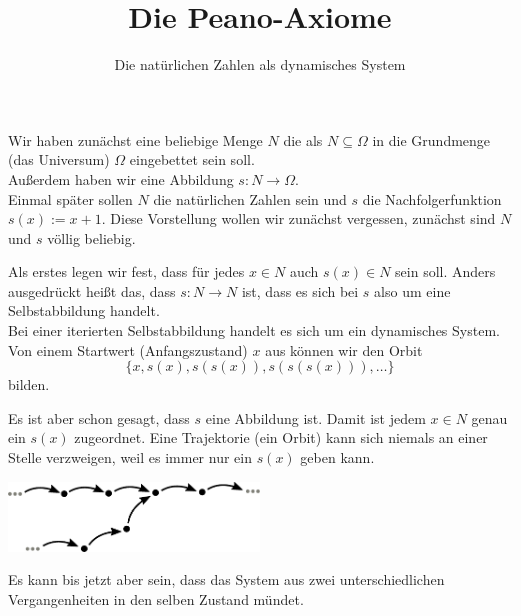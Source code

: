 \documentclass[9pt]{beamer}
\title{Die Peano-Axiome}
\subtitle{Die natürlichen Zahlen als dynamisches System}
\date{}
\newcommand{\imgcaption}[1]{{\small #1}}
\begin{document}
\renewcommand*{\figurename}{Abb.}

\begin{frame}

\maketitle

\end{frame}

\begin{frame}
Wir haben zunächst eine beliebige Menge $N$ die als $N\subseteq\Omega$
in die Grundmenge (das Universum) $\Omega$ eingebettet sein soll.\\[1em]

Außerdem haben wir eine Abbildung $s\colon N\to\Omega$.\\[1em]

Einmal später sollen $N$ die natürlichen Zahlen sein und $s$ die
Nachfolgerfunktion $s(x):=x+1$. Diese Vorstellung wollen wir zunächst
vergessen, zunächst sind $N$ und $s$ völlig beliebig.
\end{frame}

\begin{frame}
Als erstes legen wir fest, dass für jedes $x\in N$ auch $s(x)\in N$
sein soll. Anders ausgedrückt heißt das, dass $s\colon N\to N$ ist,
dass es sich bei $s$ also um eine Selbstabbildung handelt.\\[1em]

Bei einer iterierten Selbstabbildung handelt es sich um ein dynamisches
System. Von einem Startwert (Anfangszustand) $x$ aus können wir den Orbit
\[\{x,s(x),s(s(x)),s(s(s(x))),\ldots\}\]
bilden.
\end{frame}

\begin{frame}
Es ist aber schon gesagt, dass $s$ eine Abbildung ist. Damit ist jedem
$x\in N$ genau ein $s(x)$ zugeordnet. Eine Trajektorie (ein Orbit)
kann sich niemals an einer Stelle verzweigen, weil es immer nur
ein $s(x)$ geben kann.
\end{frame}

\begin{frame}
\begin{center}
\includegraphics[width=0.5\textwidth]{img/Nichtinvertierbares-System.pdf}
\end{center}
\imgcaption{Es kann bis jetzt aber sein, dass das System aus zwei
unterschiedlichen Vergangenheiten in den selben Zustand mündet.}
\end{frame}
\end{document}
